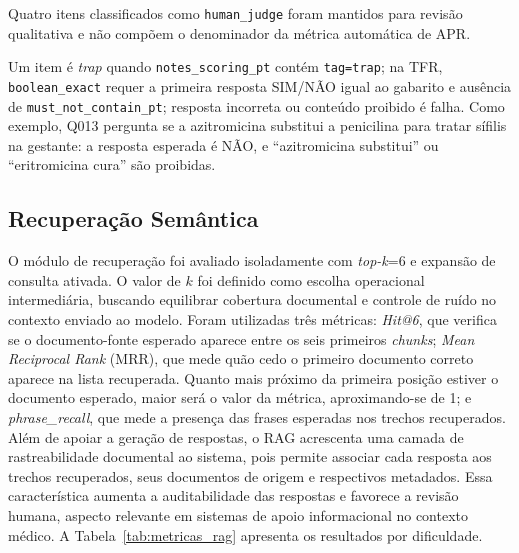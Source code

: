 \documentclass[12pt]{article}
\begin{document}
Quatro itens classificados como \texttt{human\_judge} foram mantidos para revisão qualitativa e não compõem o denominador da métrica automática de APR.


Um item é \textit{trap} quando \texttt{notes\_scoring\_pt} contém \texttt{tag=trap}; na TFR, \texttt{boolean\_exact} requer a primeira resposta SIM/NÃO igual ao gabarito e ausência de \texttt{must\_not\_contain\_pt}; resposta incorreta ou conteúdo proibido é falha. Como exemplo, Q013 pergunta se a azitromicina substitui a penicilina para tratar sífilis na gestante: a resposta esperada é NÃO, e ``azitromicina substitui'' ou ``eritromicina cura'' são proibidas.


\subsection{Recuperação Semântica}

O módulo de recuperação foi avaliado isoladamente com \textit{top-k}=6 e expansão de consulta ativada.
O valor de $k$ foi definido como escolha operacional intermediária, buscando equilibrar cobertura documental e controle de ruído no contexto enviado ao modelo.
Foram utilizadas três métricas:
\textit{Hit@6}, que verifica se o documento-fonte esperado aparece entre os seis primeiros \textit{chunks};
\textit{Mean Reciprocal Rank} (MRR), que mede quão cedo o primeiro documento correto aparece na lista recuperada. Quanto mais próximo da primeira posição estiver o documento esperado, maior será o valor da métrica, aproximando-se de 1;
e \textit{phrase\_recall}, que mede a presença das frases esperadas nos trechos recuperados.
Além de apoiar a geração de respostas, o RAG acrescenta uma camada de rastreabilidade documental ao sistema, pois permite associar cada resposta aos trechos recuperados, seus documentos de origem e respectivos metadados.
Essa característica aumenta a auditabilidade das respostas e favorece a revisão humana, aspecto relevante em sistemas de apoio informacional no contexto médico.
A Tabela~\ref{tab:metricas_rag} apresenta os resultados por dificuldade.
\end{document}

